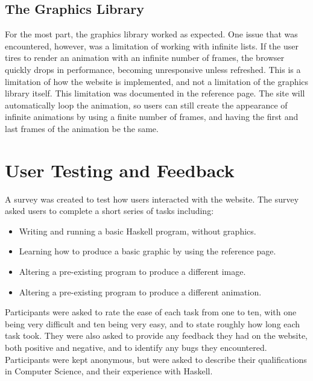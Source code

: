 \documentclass[../main.tex]{subfiles}
\begin{document}
        \subsection{The Graphics Library}
            For the most part, the graphics library worked as expected.
            One issue that was encountered, however, was a limitation of working with
                infinite lists.
            If the user tires to render an animation with an infinite number of frames, the
                browser quickly drops in performance, becoming unresponsive unless refreshed.
            This is a limitation of how the website is implemented, and not a limitation of
                the graphics library itself.
            This limitation was documented in the reference page.
            The site will automatically loop the animation, so users can still create the
                appearance of infinite animations by using a finite number of frames, and
                having the first and last frames of the animation be the same.

    \section{User Testing and Feedback}
        A survey was created to test how users interacted with the website.
        The survey asked users to complete a short series of tasks including:
        \begin{itemize}
            \item Writing and running a basic Haskell program, without graphics.
            \item Learning how to produce a basic graphic by using the reference page.
            \item Altering a pre-existing program to produce a different image.
            \item Altering a pre-existing program to produce a different animation.
        \end{itemize}

        Participants were asked to rate the ease of each task from one to ten, with one
            being very difficult and ten being very easy, and to state roughly how long
            each task took.
        They were also asked to provide any feedback they had on the website, both
            positive and negative, and to identify any bugs they encountered.
        Participants were kept anonymous, but were asked to describe their
            qualifications in Computer Science, and their experience with Haskell.
\end{document}
